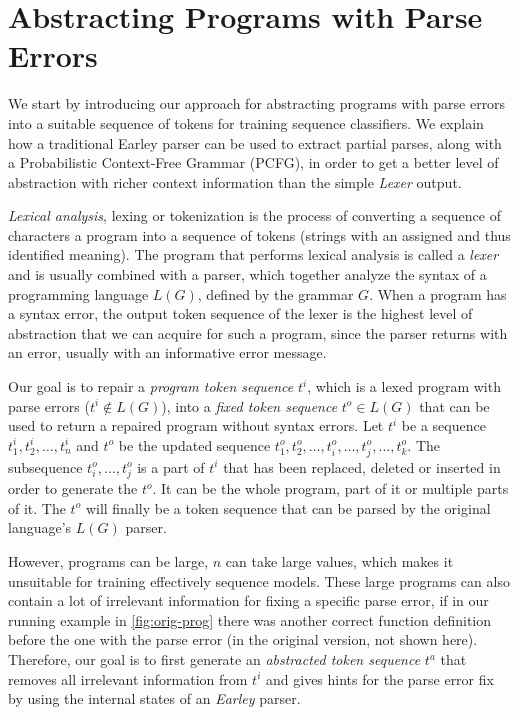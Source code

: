 \section{Abstracting Programs with Parse Errors}
\label{sec:prog-abstract}

We start by introducing our approach for abstracting programs with parse errors
into a suitable sequence of tokens for training sequence classifiers. We explain
how a traditional Earley parser can be used to extract partial parses, along
with a Probabilistic Context-Free Grammar (PCFG), in order to get a better level
of abstraction with richer context information than the simple \emph{Lexer}
output.



\emph{Lexical analysis}, lexing or tokenization is the process of converting a
sequence of characters \ie a program into a sequence of tokens (strings with an
assigned and thus identified meaning). The program that performs lexical
analysis is called a \emph{lexer} and is usually combined with a parser, which
together analyze the syntax of a programming language $L(G)$, defined by the
grammar $G$. When a program has a syntax error, the output token sequence of the
lexer is the highest level of abstraction that we can acquire for such a
program, since the parser returns with an error, usually with an informative
error message.

Our goal is to repair a \emph{program token sequence} $t^i$, which is a lexed
program with parse errors (\ie $t^i \notin L(G)$), into a \emph{fixed token
sequence} $t^o \in L(G)$ that can be used to return a repaired program without
syntax errors. Let $t^i$ be a sequence $t^i_1, t^i_2, \dots, t^i_n$ and $t^o$ be
the updated sequence $t^o_1, t^o_2, \dots, t^o_i, \dots, t^o_j, \dots, t^o_k$.
The subsequence $t^o_i, \dots, t^o_j$ is a part of $t^i$ that has been replaced,
deleted or inserted in order to generate the $t^o$. It can be the whole program,
part of it or multiple parts of it. The $t^o$ will finally be a token sequence
that can be parsed by the original language's $L(G)$ parser.

However, programs can be large, \ie $n$ can take large values, which makes it
unsuitable for training effectively sequence models. These large programs can
also contain a lot of irrelevant information for fixing a specific parse error,
\eg if in our running example in \autoref{fig:orig-prog} there was another
correct function definition before the one with the parse error (in the original
version, not shown here). Therefore, our goal is to first generate an
\emph{abstracted token sequence} $t^a$ that removes all irrelevant information
from $t^i$ and gives hints for the parse error fix by using the internal states
of an \emph{Earley} parser.


